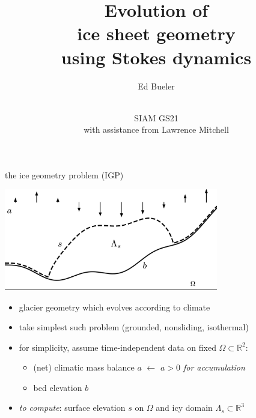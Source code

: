 \documentclass[usepdftitle=false]{beamer}
\title{Evolution of \\ ice sheet geometry \\ using Stokes dynamics}
\author{Ed Bueler}
\date{\phantom{foo} \bigskip \bigskip \bigskip \\ SIAM GS21 \\ with assistance from Lawrence Mitchell}
\newcommand{\RR}{\mathbb{R}}
\begin{document}
\begin{frame}
	\maketitle
\end{frame}


\begin{frame}{the ice geometry problem (IGP)}

\vspace{-2mm}
\begin{center}
\includegraphics[width=0.7\textwidth]{figs/stokesdomain.png}
\end{center}

\vspace{-1mm}
\begin{itemize}
\item glacier geometry which evolves according to climate
\item take simplest such problem (grounded, nonsliding, isothermal)
\item for simplicity, assume time-independent data on fixed $\Omega \subset \RR^2$:
    \begin{itemize}
    \item (net) climatic mass balance $a$ \hfill $\gets$ \emph{$a>0$ for accumulation}
    \item bed elevation $b$
    \end{itemize}
\item \emph{to compute}: surface elevation $s$ on $\Omega$ and icy domain $\Lambda_s \subset \RR^3$
\end{itemize}
\end{frame}
\end{document}
